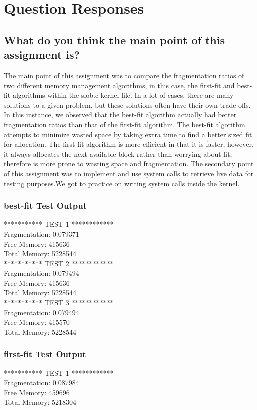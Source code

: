 \documentclass[onecolumn, draftclsnofoot,10pt, compsoc]{IEEEtran}
\begin{document}
\section{Question Responses}
\subsection{What do you think the main point of this assignment is?}
\noindent The main point of this assignment was to compare the fragmentation ratios of two different memory management algorithms, in this case, the first-fit and best-fit algorithms within the slob.c kernel file. In a lot of cases, there are many solutions to a given problem, but these solutions often have their own trade-offs. In this instance, we observed that the best-fit algorithm actually had better fragmentation ratios than that of the first-fit algorithm. The best-fit algorithm attempts to minimize wasted space by taking extra time to find a better sized fit for allocation. The first-fit algorithm is more efficient in that it is faster, however, it always allocates the next available block rather than worrying about fit, therefore is more prone to wasting space and fragmentation. The secondary point of this assignment was to implement and use system calls to retrieve live data for testing purposes.We got to practice on writing system calls inside the kernel.

\subsubsection{best-fit Test Output}
\noindent************ TEST 1 ************\\
Fragmentation: 0.079371\\
Free Memory: 415636\\
Total Memory: 5228544\\

\noindent************ TEST 2 ************\\
Fragmentation: 0.079494\\
Free Memory: 415636\\
Total Memory: 5228544\\

\noindent************ TEST 3 ************\\
Fragmentation: 0.079494\\
Free Memory: 415570\\
Total Memory: 5228544\\

\subsubsection{first-fit Test Output}
\noindent************ TEST 1 ************\\
Fragmentation: 0.087984\\
Free Memory: 459696\\
Total Memory: 5218304\\
\end{document}
